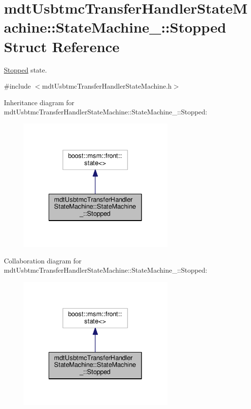 \hypertarget{structmdt_usbtmc_transfer_handler_state_machine_1_1_state_machine___1_1_stopped}{\section{mdt\-Usbtmc\-Transfer\-Handler\-State\-Machine\-:\-:State\-Machine\-\_\-\-:\-:Stopped Struct Reference}
\label{structmdt_usbtmc_transfer_handler_state_machine_1_1_state_machine___1_1_stopped}
}


\hyperlink{structmdt_usbtmc_transfer_handler_state_machine_1_1_state_machine___1_1_stopped}{Stopped} state.  




{\ttfamily \#include $<$mdt\-Usbtmc\-Transfer\-Handler\-State\-Machine.\-h$>$}



Inheritance diagram for mdt\-Usbtmc\-Transfer\-Handler\-State\-Machine\-:\-:State\-Machine\-\_\-\-:\-:Stopped\-:\nopagebreak
\begin{figure}[H]
\begin{center}
\leavevmode
\includegraphics[width=222pt]{structmdt_usbtmc_transfer_handler_state_machine_1_1_state_machine___1_1_stopped__inherit__graph}
\end{center}
\end{figure}


Collaboration diagram for mdt\-Usbtmc\-Transfer\-Handler\-State\-Machine\-:\-:State\-Machine\-\_\-\-:\-:Stopped\-:\nopagebreak
\begin{figure}[H]
\begin{center}
\leavevmode
\includegraphics[width=222pt]{structmdt_usbtmc_transfer_handler_state_machine_1_1_state_machine___1_1_stopped__coll__graph}
\end{center}
\end{figure}
